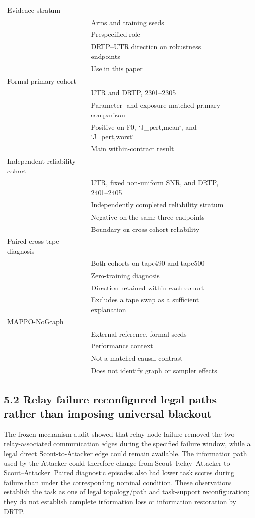 {{{{\begin{center}
\begin{tabular}{lllll}
\toprule
Evidence stratum \\& Arms and training seeds \\& Prespecified role \\& DRTP--UTR direction on robustness endpoints \\& Use in this paper \\
\midrule
Formal primary cohort \\& UTR and DRTP, 2301--2305 \\& Parameter- and exposure-matched primary comparison \\& Positive on F0, `J_pert,mean`, and `J_pert,worst` \\& Main within-contract result \\
Independent reliability cohort \\& UTR, fixed non-uniform SNR, and DRTP, 2401--2405 \\& Independently completed reliability stratum \\& Negative on the same three endpoints \\& Boundary on cross-cohort reliability \\
Paired cross-tape diagnosis \\& Both cohorts on tape490 and tape500 \\& Zero-training diagnosis \\& Direction retained within each cohort \\& Excludes a tape swap as a sufficient explanation \\
MAPPO-NoGraph \\& External reference, formal seeds \\& Performance context \\& Not a matched causal contrast \\& Does not identify graph or sampler effects \\
\bottomrule
\end{tabular}
\end{center}

\subsection{5.2 Relay failure reconfigured legal paths rather than imposing universal blackout}

The frozen mechanism audit showed that relay-node failure removed the two relay-associated communication edges during the specified failure window, while a legal direct Scout-to-Attacker edge could remain available. The information path used by the Attacker could therefore change from Scout--Relay--Attacker to Scout--Attacker. Paired diagnostic episodes also had lower task scores during failure than under the corresponding nominal condition. These observations establish the task as one of legal topology/path and task-support reconfiguration; they do not establish complete information loss or information restoration by DRTP.

}}}}
